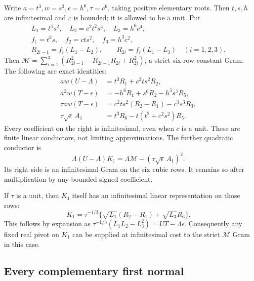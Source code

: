 Write \(a=t^3,w=s^3,\epsilon=h^6,\tau=c^6\), taking positive
elementary roots. Then \(t,s,h\) are infinitesimal and \(c\)
is bounded; it is allowed to be a unit. Put
\[
\begin{gathered}
 L_1=t^4s^2,\quad L_2=c^2t^2s^4,\quad L_3=h^6c^4,\\
 f_1=t^2s,\quad f_2=cts^2,\quad f_3=h^3c^2,\\
 R_{2i-1}=f_i(L_1-L_2),\qquad R_{2i}=f_i(L_1-L_3)
 \quad (i=1,2,3).
\end{gathered}\tag{WN24}
\]
Then \(\mathcal M=\sum_{i=1}^3(R_{2i-1}^2-R_{2i-1}R_{2i}+R_{2i}^2)\),
a strict six-row constant Gram. The following are exact identities:
\[
\begin{aligned}
 aw(U-\Lambda)&=t^3R_1+c^2ts^2R_2,\\
 a^2w(T-\epsilon)&=-h^6R_1+s^6R_2-h^3s^3R_5,\\
 \tau aw(T-\epsilon)&=c^2ts^2(R_2-R_1)-c^3s^3R_3,\\
 \tau\sqrt\epsilon\,A_1&=t^3R_6-t(t^2+c^2s^2)R_5 .
\end{aligned}\tag{WN25}
\]
Every coefficient on the right is infinitesimal, even when \(c\)
is a unit. These are finite linear conductors, not limiting
approximations. The further quadratic conductor is
\[
 \boxed{\ \Lambda(U-\Lambda)K_1
       =\Lambda\mathcal M-(\tau\sqrt\epsilon\,A_1)^2.\ }
 \tag{WN26}
\]
Its right side is an infinitesimal Gram on the six cubic rows.
It remains so after multiplication by any bounded signed coefficient.

If \(\tau\) is a unit, then \(K_1\) itself has an infinitesimal
linear representation on those rows:
\[
 K_1=\tau^{-1/3}
       \{\sqrt{L_1}(R_2-R_1)+\sqrt{L_3}R_6\}.
 \tag{WN27}
\]
This follows by expansion as
\(\tau^{-1/3}(L_1L_2-L_3^2)=UT-\Lambda\epsilon\).
Consequently any fixed real pivot on \(K_1\) can be supplied at
infinitesimal cost to the strict \(\mathcal M\) Gram in this case.

\subsection{Every complementary first normal}

